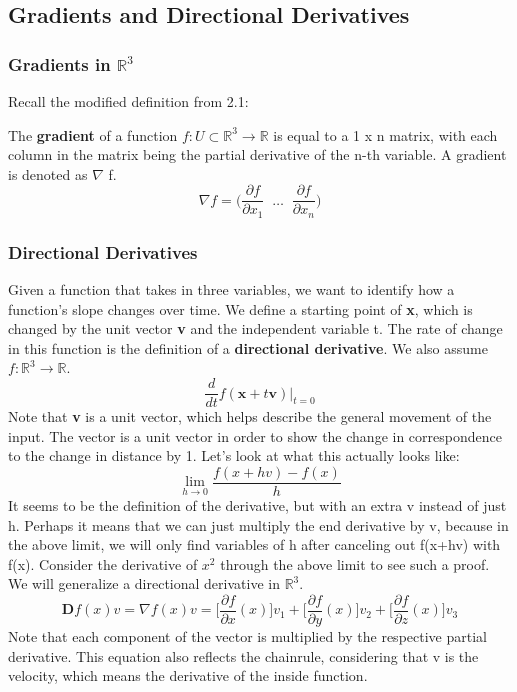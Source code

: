 \documentclass{article}
\begin{document}
\subsection{Gradients and Directional Derivatives}
\subsubsection{Gradients in $\mathbb{R}^3$}
Recall the modified definition from 2.1:

The \textbf{gradient} of a function $f : U \subset \mathbb{R}^3 \rightarrow \mathbb{R}$ is equal to a 1 x n matrix, with each column in the matrix being the partial derivative of the n-th variable. A gradient is denoted as 
$\nabla$ f.
\[
  \nabla f = \bigg( \frac{\partial f}{\partial x_1}\; \;  \hdots \; \; \frac{\partial f}{\partial x_n} \bigg)
\]
\subsubsection{Directional Derivatives}
Given a function that takes in three variables, we want to identify how a function's slope changes over time. We define a starting point of \textbf{x}, which is changed by the unit vector \textbf{v} and the independent variable t. The rate of change in this function is the definition of a \textbf{directional derivative}. We also assume $f: \mathbb{R}^3 \rightarrow \mathbb{R}$.
\[
  \frac{d}{dt} f(\textbf{x} + t\textbf{v})\bigg|_{t=0}
\]
Note that \textbf{v} is a unit vector, which helps describe the general movement of the input. The vector is a unit vector in order to show the change in correspondence to the change in distance by 1.\newline
Let's look at what this actually looks like:
\[
  \lim_{h\rightarrow0} \frac{f(x+hv) - f(x)}{h}
\]
It seems to be the definition of the derivative, but with an extra v instead of just h. Perhaps it means that we can just multiply the end derivative by v, because in the above limit, we will only find variables of h after canceling out f(x+hv) with f(x). Consider the derivative of $x^2$ through the above limit to see such a proof. We will generalize a directional derivative in $\mathbb{R}^3$.
\[
  \textbf{D}f(x)v = \nabla f(x)v = \bigg[\frac{\partial f}{\partial x}(x)\bigg]v_1 + \bigg[\frac{\partial f}{\partial y}(x)\bigg]v_2 + \bigg[\frac{\partial f}{\partial z}(x)\bigg]v_3
\]
Note that each component of the vector is multiplied by the respective partial derivative. This equation also reflects the chainrule, considering that v is the velocity, which means the derivative of the inside function.
\end{document}
